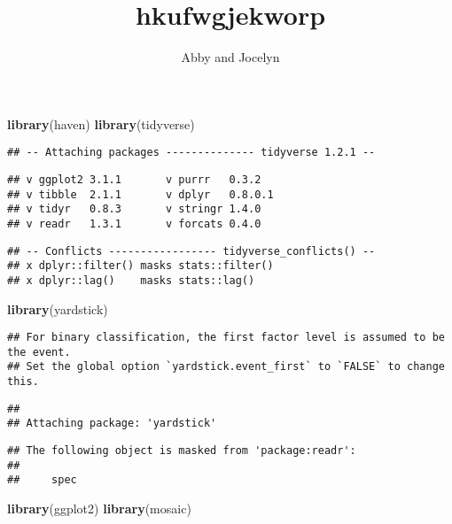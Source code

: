 \documentclass[]{article}
\title{hkufwgjekworp}
\author{Abby and Jocelyn}
\date{}
\newenvironment{Shaded}{\begin{snugshade}}{\end{snugshade}}
\newcommand{\KeywordTok}[1]{\textcolor[rgb]{0.13,0.29,0.53}{\textbf{#1}}}
\newcommand{\NormalTok}[1]{#1}
\begin{document}
\maketitle

\begin{Shaded}
\begin{Highlighting}[]
\KeywordTok{library}\NormalTok{(haven)}
\KeywordTok{library}\NormalTok{(tidyverse)}
\end{Highlighting}
\end{Shaded}

\begin{verbatim}
## -- Attaching packages -------------- tidyverse 1.2.1 --
\end{verbatim}

\begin{verbatim}
## v ggplot2 3.1.1       v purrr   0.3.2  
## v tibble  2.1.1       v dplyr   0.8.0.1
## v tidyr   0.8.3       v stringr 1.4.0  
## v readr   1.3.1       v forcats 0.4.0
\end{verbatim}

\begin{verbatim}
## -- Conflicts ----------------- tidyverse_conflicts() --
## x dplyr::filter() masks stats::filter()
## x dplyr::lag()    masks stats::lag()
\end{verbatim}

\begin{Shaded}
\begin{Highlighting}[]
\KeywordTok{library}\NormalTok{(yardstick)}
\end{Highlighting}
\end{Shaded}

\begin{verbatim}
## For binary classification, the first factor level is assumed to be the event.
## Set the global option `yardstick.event_first` to `FALSE` to change this.
\end{verbatim}

\begin{verbatim}
## 
## Attaching package: 'yardstick'
\end{verbatim}

\begin{verbatim}
## The following object is masked from 'package:readr':
## 
##     spec
\end{verbatim}

\begin{Shaded}
\begin{Highlighting}[]
\KeywordTok{library}\NormalTok{(ggplot2)}
\KeywordTok{library}\NormalTok{(mosaic)}
\end{Highlighting}
\end{Shaded}
\end{document}
